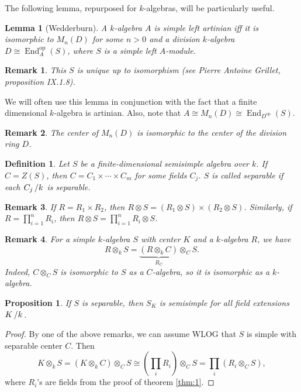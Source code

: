 \documentclass[10pt, a4paper]{article}
\newtheorem{proposition}[thm]{Proposition}
\newtheorem{defi}[thm]{Definition}
\newenvironment{noticeB}{%
  \tcolorbox[%
  notitle,
  empty,
  enhanced,  %
  breakable,
  coltext=black,
  colback=white, 
  fontupper=\rmfamily,
  noparskip,
  sharp corners,
  boxrule=-1pt,  %
  frame hidden,
  left=7pt,  %
  right=7pt,
  top=5pt,
  bottom=5pt,
  before skip=2.5ex plus 2pt,
  after skip=2.5ex plus 2pt,
  borderline west = {1.5pt}{-0.1pt}{blue!30!black}, %
  overlay unbroken and last={%
    \draw[color=black, line width=1.25pt]
    ($(frame.south west)+(1.pt, -0.1pt)$) -- ++(2em, 0);
  }
  ]}
{\endtcolorbox}
\newenvironment{definition}{\begin{noticeB}\begin{defi}}{%
    \end{defi}\end{noticeB}}
\newtheorem*{remark}{Remark}
\newtheorem{lemma}[thm]{Lemma}
\newenvironment{noticeC}{%
  \tcolorbox[%
  notitle,
  empty,
  enhanced,  %
  breakable,
  coltext=black, 
  fontupper=\rmfamily,
  noparskip,
  sharp corners,
  boxrule=-1pt,  %
  frame hidden,
  left=7pt,  %
  right=7pt,
  top=5pt,
  bottom=5pt,
  before skip=2.5ex plus 2pt,
  after skip=2.5ex plus 2pt,
  overlay unbroken and last={%
  },
  ]}
{\endtcolorbox}
\newenvironment{myproof}%
  {\begin{noticeC}\begin{proof}}%
  {\end{proof}\end{noticeC}}
\newcommand{\quot}[2]{{\raisebox{0em}{$#1$}\left/\raisebox{0em}{$#2$}\right.}}
\DeclareMathOperator{\op}{op}
\DeclareMathOperator{\en}{End}
\begin{document}
The following lemma, repurposed for $k$-algebras, will be particularly useful.

\begin{lemma}[Wedderburn]
  A $k$-algebra $A$ is simple left artinian iff it is isomorphic to $M_n (D)$ for some $n > 0$
  and a division $k$-algebra $D \cong \en_A ^{\op} (S)$, where $S$ is a simple left $A$-module.
\end{lemma}

\begin{remark}
  This $S$ is unique up to isomorphism (see Pierre Antoine Grillet, proposition IX.1.8).
\end{remark}

We will often use this lemma in conjunction with the fact that a finite dimensional $k$-algebra is artinian.
Also, note that $A \cong M_n (D) \cong \en_{D^{\op}} (S)$.

\begin{remark}
  The center of $M_n (D)$ is isomorphic to the center of the division ring $D$.
\end{remark}

\begin{definition}
  Let $S$ be a finite-dimensional semisimple algebra over $k$. If $C = Z(S)$,
  then $C = C_1 \times \cdots \times C_m$ for some fields $C_j$. $S$ is called separable if each $\quot{C_j}{k}$ is separable.
\end{definition}

\begin{remark}
  If $R = R_1 \times R_2$, then $R \otimes S = (R_1 \otimes S) \times (R_2 \otimes S)$.
  Similarly, if $R = \prod_{i = 1} ^n R_i$, then $R \otimes S = \prod_{i = 1} ^n R_i \otimes S$.
\end{remark}

\begin{remark}
  For a simple $k$-algebra $S$ with center $K$ and a $k$-algebra $R$, we have $$R \otimes_k S = \underbrace{(R \otimes_k C)}_{R_C} \otimes_C S.$$
  Indeed, $C \otimes_C S$ is isomorphic to $S$ as a $C$-algebra, so it is isomorphic as a $k$-algebra. 
\end{remark}

\begin{proposition}
  If $S$ is separable, then $S_K$ is semisimple for all field extensions $\quot{K}{k}$.
\end{proposition}

\begin{myproof}
  By one of the above remarks, we can assume WLOG that $S$ is simple with separable center $C$.
  Then 
  $$K \otimes_k S = (K \otimes_k C) \otimes_C S \cong (\prod_i R_i) \otimes_C S = \prod_i (R_i \otimes_C S),$$
  where $R_i$'s are fields from the proof of theorem \ref{thm:1}.
\end{myproof}
\end{document}
